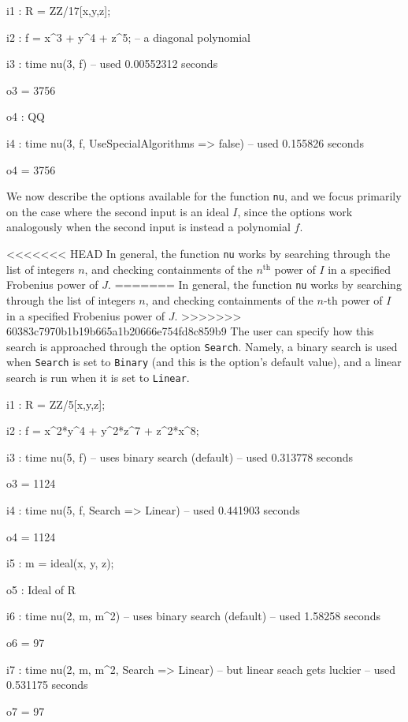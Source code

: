 \documentclass{amsart}
\begin{document}
{\small
{}
\begin{MyVerbatim}

i1 : R = ZZ/17[x,y,z];

i2 : f = x^3 + y^4 + z^5; -- a diagonal polynomial

i3 : time nu(3, f)
     -- used 0.00552312 seconds

o3 = 3756

o4 : QQ

i4 : time nu(3, f, UseSpecialAlgorithms => false)
     -- used 0.155826 seconds

o4 = 3756
\end{MyVerbatim}
}
\medspace


We now describe the options available for the function {\tt nu}, and we focus primarily on the case where the second input is an ideal $I$, since the options work analogously when the second input is instead a polynomial $f$.

<<<<<<< HEAD
In general, the function {\tt nu} works by searching through the list of integers $n$, and checking containments of the $n^\text{th}$ power of $I$ in a specified Frobenius power of $J$.
=======
In general, the function {\tt nu} works by searching through the list of integers $n$, and checking containments of the $n$-th power of $I$ in a specified Frobenius power of $J$.  
>>>>>>> 60383c7970b1b19b665a1b20666e754fd8c859b9
The user can specify how this search is approached through the  option {\tt Search}.  Namely, a binary search is used when {\tt Search} is set to {\tt Binary} (and this is the option's default value), and a linear search is run when it is set to {\tt Linear}.

{\small
{}
\begin{MyVerbatim}

i1 : R = ZZ/5[x,y,z];

i2 : f = x^2*y^4 + y^2*z^7 + z^2*x^8;

i3 : time nu(5, f) -- uses binary search (default)
     -- used 0.313778 seconds

o3 = 1124

i4 : time nu(5, f, Search => Linear)
     -- used 0.441903 seconds

o4 = 1124

i5 : m = ideal(x, y, z);

o5 : Ideal of R

i6 : time nu(2, m, m^2) -- uses binary search (default)
     -- used 1.58258 seconds

o6 = 97

i7 : time nu(2, m, m^2, Search => Linear) -- but linear seach gets luckier
     -- used 0.531175 seconds

o7 = 97
\end{MyVerbatim}
}
\medspace
\end{document}
